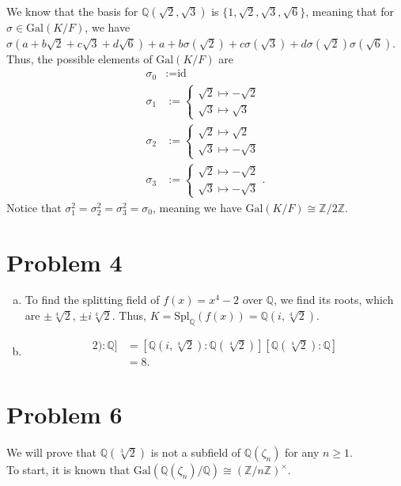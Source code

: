 \documentclass[10pt]{extarticle}
\newcommand{\Q}{\mathbb{Q}}
\newcommand{\Z}{\mathbb{Z}}
\begin{document}
  We know that the basis for $\Q(\sqrt{2},\sqrt{3})$ is $\{1,\sqrt{2},\sqrt{3},\sqrt{6}\}$, meaning that for $\sigma\in \text{Gal}(K/F)$, we have $\sigma(a + b\sqrt{2} + c\sqrt{3} + d\sqrt{6}) + a + b\sigma(\sqrt{2}) + c\sigma(\sqrt{3}) + d\sigma(\sqrt{2})\sigma(\sqrt{6})$. Thus, the possible elements of $\text{Gal}(K/F)$ are
  \begin{align*}
    \sigma_0 &:= \text{id}\\
    \sigma_1 &:= \begin{cases}
      \sqrt{2} \mapsto -\sqrt{2}\\
      \sqrt{3} \mapsto \sqrt{3}
    \end{cases}\\
      \sigma_2 &:= \begin{cases}
        \sqrt{2} \mapsto \sqrt{2}\\
        \sqrt{3} \mapsto -\sqrt{3}
      \end{cases}\\
        \sigma_3 &:= \begin{cases}
          \sqrt{2} \mapsto -\sqrt{2}\\
          \sqrt{3} \mapsto -\sqrt{3}
        \end{cases}.
  \end{align*}
  Notice that $\sigma_1^{2} = \sigma_2^{2} = \sigma_3^{2} = \sigma_0$, meaning we have $\text{Gal}(K/F)\cong \Z/2\Z$.
  \section{Problem 4}%
  \begin{enumerate}[(a)]
    \item To find the splitting field of $f(x) = x^4 - 2$ over $\Q$, we find its roots, which are $\pm \sqrt[4]{2}$, $\pm i\sqrt[4]{2}$. Thus, $ K = \text{Spl}_{\Q}(f(x)) = \Q(i,\sqrt[4]{2})$.
    \item 
      \begin{align*}
        [\Q(i,\sqrt[4]{2}) : \Q] &= [\Q(i,\sqrt[4]{2}):\Q(\sqrt[4]{2})][\Q(\sqrt[4]{2}):\Q]\\
                                 &= 8.
      \end{align*}
  \end{enumerate}
  \section{Problem 6}%
  We will prove that $\Q(\sqrt[3]{2})$ is not a subfield of $\Q(\zeta_n)$ for any $n\geq 1$.\\

  To start, it is known that $\text{Gal}(\Q(\zeta_n)/\Q) \cong (\Z/n\Z)^{\times}$. 
\end{document}
